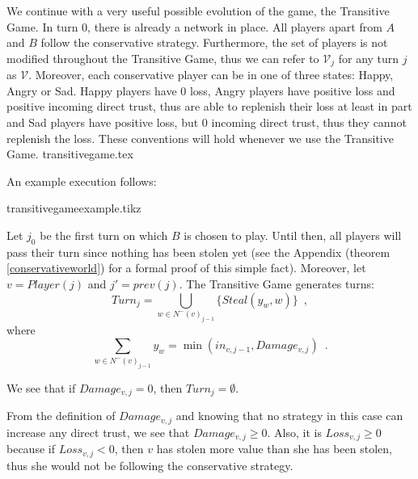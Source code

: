    We continue with a very useful possible evolution of the game, the Transitive Game. In turn 0, there is already a network
   in place. All players apart from $A$ and $B$ follow the conservative strategy. Furthermore, the set of players is not
   modified throughout the Transitive Game, thus we can refer to $\mathcal{V}_j$ for any turn $j$ as $\mathcal{V}$.
   Moreover, each conservative player can be in one of three states: Happy, Angry or Sad. Happy players have 0 loss, Angry
   players have positive loss and positive incoming direct trust, thus are able to replenish their loss at least in part and
   Sad players have positive loss, but 0 incoming direct trust, thus they cannot replenish the loss. These conventions will
   hold whenever we use the Transitive Game.
   {transitivegame.tex}

   An example execution follows:

   {transitivegameexample.tikz}

   Let $j_0$ be the first turn on which $B$ is chosen to play. Until then, all players will pass their turn since nothing
   has been stolen yet (see the Appendix (theorem \ref{conservativeworld}) for a formal proof of this simple fact).
   Moreover, let $v = Player(j)$ and $j' = prev\left(j\right)$.
   The Transitive Game generates turns:
   \begin{equation}
      Turn_j = \bigcup\limits_{w \in N^{-}\left(v\right)_{j-1}}\{Steal\left(y_w,w\right)\} \enspace,
   \end{equation}
   where
   \begin{equation*}
      \sum\limits_{w \in N^{-}\left(v\right)_{j-1}}y_w = \min\left(in_{v, j-1}, Damage_{v, j}\right) \enspace.
   \end{equation*}
 
   We see that if $Damage_{v, j} = 0$, then $Turn_j = \emptyset$.

   From the definition of $Damage_{v,j}$ and knowing that no strategy in this case can increase any direct trust, we see
   that $Damage_{v,j} \geq 0$. Also, it is $Loss_{v,j} \geq 0$ because if $Loss_{v,j} < 0$, then $v$ has
   stolen more value than she has been stolen, thus she would not be following the conservative strategy.
